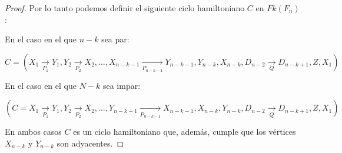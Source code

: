\begin{proof}
            Por lo tanto podemos definir el siguiente ciclo hamiltoniano $C$ en
            $Fk(F_n)$: 
    
            En el caso en el que $n-k$ sea par:
            
            $C =(X_1 \xrightarrow[P_1]{} Y_1, Y_2 \xrightarrow[P_2]{} X_2, \dots,
            X_{n-k-1} \xrightarrow[P_{n-k-1}]{} Y_{n-k-1}, Y_{n-k}, X_{n-k}, D_{n-2}
            \xrightarrow[Q]{} D_{n-k+1}, Z, X_1)$
    
            En el caso en el que $N-k$ sea impar:
    
            $(C =X_1 \xrightarrow[P_1]{} Y_1, Y_2 \xrightarrow[P_2]{} X_2, \dots,
            Y_{n-k-1} \xrightarrow[P_{n-k-1}]{} X_{n-k-1}, X_{n-k}, Y_{n-k}, D_{n-2}
            \xrightarrow[Q]{} D_{n-k+1}, Z, X_1)$
    
            En ambos casos $C$ es un ciclo hamiltoniano que, adem\'as, cumple que
            los v\'ertices $X_{n-k}$ y $Y_{n-k}$ son adyacentes. 
    
        \end{proof}